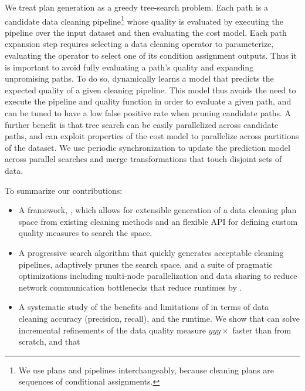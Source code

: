 We treat plan generation as a greedy tree-search problem.  Each path is a candidate data cleaning pipeline\footnote{We use plans and pipelines interchangeably, because cleaning plans are sequences of conditional assignments.} whose quality is evaluated by executing the pipeline over the input dataset and then evaluating the cost model.  Each path expansion step requires selecting a data cleaning operator to parameterize, evaluating the operator to select one of its condition assignment outputs.  Thus it is important to avoid fully evaluating a path's quality and expanding unpromising paths.    To do so, \sys dynamically learns a model that predicts the expected quality of a given cleaning pipeline.  This model thus avoids the need to execute the pipeline and quality function in order to evaluate a given path, and can be tuned to have a low false positive rate when pruning candidate paths.  A further benefit is that tree search can be easily parallelized across candidate paths, and can exploit properties of the cost model to parallelize across partitions of the dataset.  We use periodic synchronization to update the prediction model across parallel searches and merge transformations that touch disjoint sets of data.  

\noindent To summarize our contributions:

\begin{itemize}[leftmargin=*, topsep=0mm, itemsep=0mm]
  \item A framework, \sys, which allows for extensible generation of a data cleaning plan space from existing cleaning methods and an flexible API for defining custom quality measures to search the space.
  \item A progressive search algorithm that quickly generates acceptable cleaning pipelines, adaptively prunes the search space, and a suite of pragmatic optimizations including multi-node parallelization and data sharing to reduce network communication bottlenecks that reduce runtimes by .   
  \item A systematic study of the benefits and limitations of \sys in terms of data cleaning accuracy (precision, recall), and the runtime.  We show that \sys can solve incremental refinements of the data quality measure $yyy\times$ faster than from scratch, and that 
\end{itemize}



